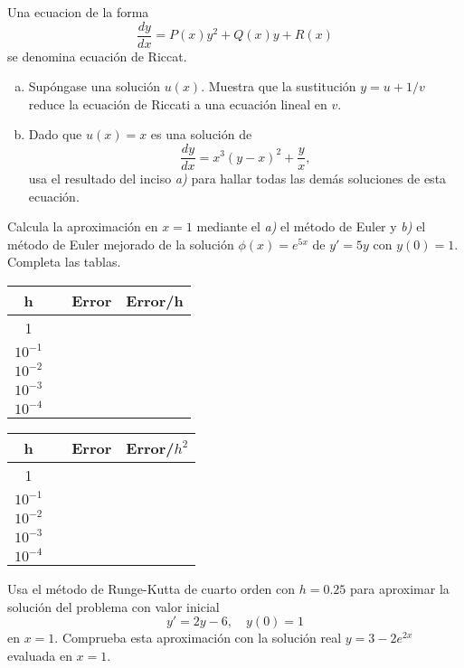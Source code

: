 \documentclass[12pt]{exam}
\begin{document}
\begin{questions}
     \question
     Una ecuacion de la forma $$\frac{dy}{dx}=P(x)y^2+Q(x)y+R(x)$$ se denomina ecuación de Riccat.
     \begin{enumerate}[a)]
     		\item Supóngase una solución $u(x)$. Muestra que la sustitución $y=u+1/v$ reduce la ecuación de Riccati a una ecuación lineal en $v$.
            \item Dado que $u(x)=x$ es una solución de $$\frac{dy}{dx}=x^3(y-x)^2+\frac{y}{x},$$ usa el resultado del inciso \textit{a)} para hallar todas las demás soluciones de esta ecuación.
     \end{enumerate}

     \question
     Calcula la aproximación en $x=1$  
     mediante el \textit{a)} el método de Euler y \textit{b)} el método de Euler mejorado de la solución $\phi(x)=e^{5x}$ de $y'=5y$ con $y(0)=1$. Completa las tablas.
    
    \small
     \begin{tabular}{cm{2.5cm}cc}
     \hline
     h&\centering{Aproximación de Euler}&Error&Error/h\\
     \hline
     1\\
     $10^{-1}$\\
     $10^{-2}$\\
     $10^{-3}$\\
     $10^{-4}$\\
     \hline
     \end{tabular}
     \begin{tabular}{cm{3cm}cc}
     \hline
     h&\centering{Aproximación de Euler mejorado}&Error&Error/$h^2$\\
     \hline
     1\\
     $10^{-1}$\\
     $10^{-2}$\\
     $10^{-3}$\\
     $10^{-4}$\\
     \hline
     \end{tabular}
     
  
     

     \question
     Usa el método de Runge-Kutta de cuarto orden con $h=0.25$ para aproximar la solución del problema con valor inicial $$y'=2y-6,\quad y(0)=1$$ en $x=1$. Comprueba esta aproximación con la solución real $y=3-2e^{2x}$ evaluada en $x=1$.

        \end{questions}
        \vskip30pt
\end{document}
